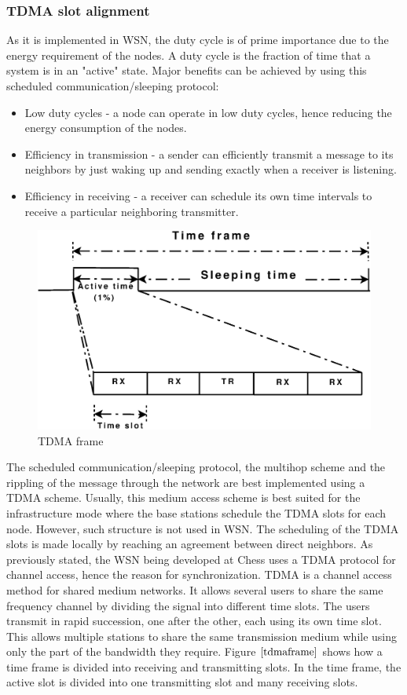 \documentclass[a4paper,10pt]{report}
\begin{document}
\subsubsection{TDMA slot alignment}
As it is implemented in WSN, the duty cycle is of prime importance
due to the energy requirement of the nodes. A duty cycle is the
fraction of time that a system is in an "active" state. Major
benefits can be achieved by using this scheduled
communication/sleeping protocol:
\begin{itemize}
\item Low duty cycles - a node can operate in low duty cycles, hence reducing the energy consumption of the nodes.
\item Efficiency in transmission - a sender can efficiently transmit a message to its neighbors by just waking up and sending exactly when a receiver is listening.
\item Efficiency in receiving - a receiver can schedule its own time intervals to receive a particular neighboring transmitter.
\end{itemize}
\begin{figure}[b]
\centering
\includegraphics[width=0.5 \textwidth]{tdmaframe}
\caption{TDMA frame} \label{tdmaframe}
\end{figure}
The scheduled communication/sleeping protocol, the multihop scheme and the rippling of the message through the network are best implemented using a TDMA scheme. Usually, this medium access scheme is best suited for the infrastructure mode where the base stations schedule the TDMA slots for each node. However, such structure is not used in WSN. The scheduling of the TDMA slots is made locally by reaching an agreement between direct neighbors. As previously stated, the WSN being developed at Chess uses a TDMA protocol for channel access, hence the reason for synchronization. TDMA is a channel access method for shared medium networks. It allows several users to share the same frequency
channel by dividing the signal into different time slots. The users transmit in rapid succession, one after the other, each using its
own time slot. This allows multiple stations to share the same transmission medium while using only the part of the bandwidth they
require. Figure $\ref{tdmaframe}$ shows how a time frame is divided into receiving and transmitting slots. In the time frame, the active slot is divided into one transmitting slot and many receiving slots.
\end{document}
